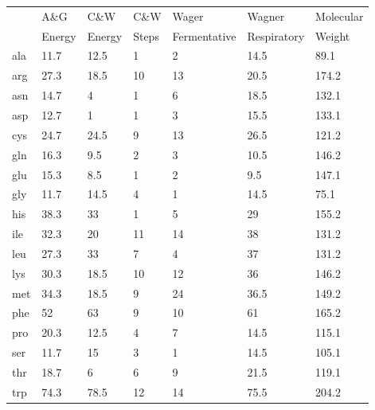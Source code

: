 \begin{table}
\centering
\begin{footnotesize}
  \begin{tabular}{ p{0.8cm} *{6}{p{1.8cm}} }
                                                                                \toprule
          & A\&G   & C\&W   & C\&W  & Wager        & Wagner      & Molecular \\
          & Energy & Energy & Steps & Fermentative & Respiratory & Weight    \\ \midrule
      ala & 11.7   & 12.5   & 1     & 2            & 14.5        & 89.1      \\
      arg & 27.3   & 18.5   & 10    & 13           & 20.5        & 174.2     \\
      asn & 14.7   & 4      & 1     & 6            & 18.5        & 132.1     \\
      asp & 12.7   & 1      & 1     & 3            & 15.5        & 133.1     \\
      cys & 24.7   & 24.5   & 9     & 13           & 26.5        & 121.2     \\
      gln & 16.3   & 9.5    & 2     & 3            & 10.5        & 146.2     \\
      glu & 15.3   & 8.5    & 1     & 2            & 9.5         & 147.1     \\
      gly & 11.7   & 14.5   & 4     & 1            & 14.5        & 75.1      \\
      his & 38.3   & 33     & 1     & 5            & 29          & 155.2     \\
      ile & 32.3   & 20     & 11    & 14           & 38          & 131.2     \\
      leu & 27.3   & 33     & 7     & 4            & 37          & 131.2     \\
      lys & 30.3   & 18.5   & 10    & 12           & 36          & 146.2     \\
      met & 34.3   & 18.5   & 9     & 24           & 36.5        & 149.2     \\
      phe & 52     & 63     & 9     & 10           & 61          & 165.2     \\
      pro & 20.3   & 12.5   & 4     & 7            & 14.5        & 115.1     \\
      ser & 11.7   & 15     & 3     & 1            & 14.5        & 105.1     \\
      thr & 18.7   & 6      & 6     & 9            & 21.5        & 119.1     \\
      trp & 74.3   & 78.5   & 12    & 14           & 75.5        & 204.2     \\

\end{tabular}
\end{footnotesize}
\end{table}
